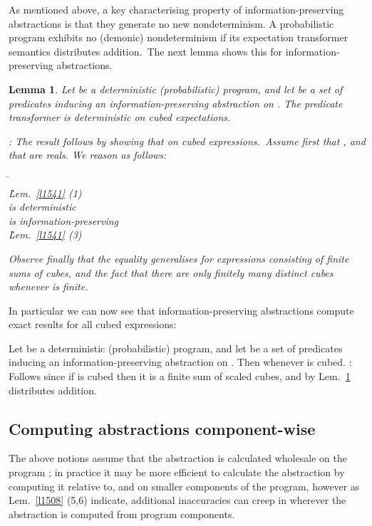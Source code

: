 \documentclass[numbers,copyright,creativecommons]{eptcs}
\newcommand{\Wp}{\mbox{\sf wp}}
\newcommand{\Prog}{\textit{Prog}}
\newtheorem{Lems}{Lemma} \newcommand{\Lem}[1]{Lem.~\ref{#1}}
\newcommand{\Proof}{\noindent{\bf Proof}: \quad}
\newenvironment{Reason}{\begin{tabbing}\hspace{4em}\=\kill}{\end{tabbing}\vspace{-2.5ex}}
\newcommand{\Step}[2]{#1 \>  \\}
\newcommand{\StepR}[3]{#1 \>  \` {\RF #2} \\}
\newcommand{\RF}{\small}
\begin{document}
As mentioned above, a key characterising property of information-preserving abstractions is that they generate no new nondeterminism.
A probabilistic program exhibits no (demonic) nondeterminism if its expectation transformer semantics distributes addition.\ The next lemma shows this for information-preserving abstractions.




\begin{Lems}\label{l0723}
Let  be a deterministic (probabilistic) program, and let  be a set of predicates inducing an information-preserving abstraction on . The predicate transformer  is deterministic on cubed expectations.

\Proof
The result follows by showing that  on cubed expressions.\ Assume first that , and that  are reals. We reason as follows:

\begin{Reason}
\Step{}
{\Wp_\Phi.\Prog.(\lambda[c] + \lambda'[c'])}
\StepR{}{\Lem{l1541} (1)}
{\Wp.\Prog.(\lambda[c] + \lambda'[c'])}
\StepR{}{ is deterministic}
{\lambda\Wp.\Prog.[c] + \lambda'\Wp.\Prog.[c']}
\StepR{}{ is information-preserving}
{\lambda\Wp_\Phi.\Prog.[c] + \lambda'\Wp_\Phi.\Prog.[c']}
\StepR{}{\Lem{l1541} (3)}
{\Wp_\Phi.\Prog.(\lambda[c] + \lambda'[c'])~.}
\end{Reason}
Observe finally that the equality generalises for expressions consisting of finite sums of cubes, and the fact that there are only finitely many distinct cubes whenever  is finite.
\end{Lems}

In particular we can now see that information-preserving abstractions compute exact results for all cubed expressions:

\begin{Corl}\label{c1233}
Let  be a deterministic (probabilistic) program, and let  be a set of predicates inducing an information-preserving abstraction on . Then  whenever  is cubed.
\Proof
Follows since if  is cubed then it is a finite sum of scaled cubes, and by \Lem{l0723}  distributes addition.
\end{Corl}

\subsection{Computing abstractions component-wise}

The above notions assume that the abstraction is calculated wholesale on the program ; in practice it may be more efficient to calculate the abstraction by computing it relative to, and on smaller components of the program, however as \Lem{l1508} (5,6) indicate, additional inaccuracies can creep in wherever the abstraction is computed from program components.
\end{document}
